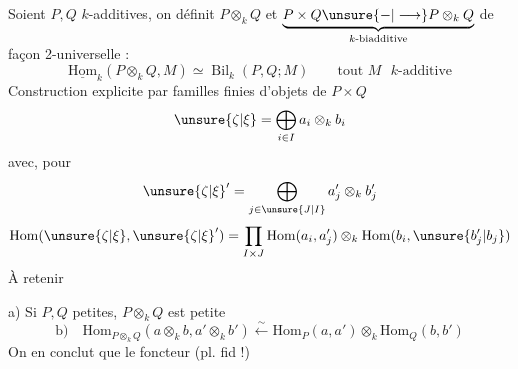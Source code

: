 Soient $P,Q$ $k$-additives, on définit $P\otimes_kQ$ et
$\underbrace{P\times Q\unsure{-|\longrightarrow}P\otimes_kQ}_{k\text{-biadditive}}$
de façon 2-universelle :
\[
\underline{\mathrm{Hom}}_k(P\otimes_kQ,M)\simeq\operatorname{Bil}_k(P,Q;M)
\qquad\text{tout }M\text{ $k$-additive}
\]
Construction explicite par familles finies d'objets de $P\times Q$
\[
\unsure{\zeta|\xi}=\bigoplus_{i\in I}a_i\otimes_k b_i
\]
avec, pour
\[
\unsure{\zeta|\xi}'=\bigoplus_{j\in\unsure{J|I}}a'_j\otimes_k b'_j
\]
\[
\mathrm{Hom}(\unsure{\zeta|\xi},\unsure{\zeta|\xi}')=
\prod_{I\times J}\mathrm{Hom}(a_i,a'_j)\otimes_k\mathrm{Hom}(b_i,\unsure{b'_j|b_j})
\]
À retenir

 a) Si $P,Q$ petites, $P\otimes_kQ$ est petite
\[
\text{b)}\quad
\mathrm{Hom}_{P\otimes_kQ}(a\otimes_kb,a'\otimes_kb')
\xleftarrow{\sim}\mathrm{Hom}_P(a,a')\otimes_k\mathrm{Hom}_Q(b,b')
\]
On en conclut que le foncteur  (pl. fid !)
